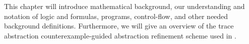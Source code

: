 \newcommand{\stateSpace}{\ensuremath{S_{V, \mu}}}
\begin{comment}
	This chapter is mostly focused on trace abstraction $\rightarrow$  It introduces the reader to the concept of trace abstraction. \\
	- Introduce logic, logical variables, terms, formulas, transition formulas with primed and unprimed variables, programs, program states, loops $\rightarrow$  then program-, error traces, feasible and infeasible counterexamples, CFGs, interpolants. \\ - From intuitive to true definitions. \\
	Here the running example from the introduction gets dissected to illustrate the definitions. \\ 
	Further the problems loops can cause are introduced, followed by a definition of loop summaries $\rightarrow$ introduction reflexive transitive closure of a formula 
	15 pages
\end{comment}

This chapter will introduce mathematical background, our understanding and notation of logic and formulas, programs, control-flow, and other needed background definitions. Furthermore, we will give an overview of the trace abstraction \cite{10.1007/978-3-642-03237-0_7} counterexample-guided abstraction refinement scheme used in \ultimate.


